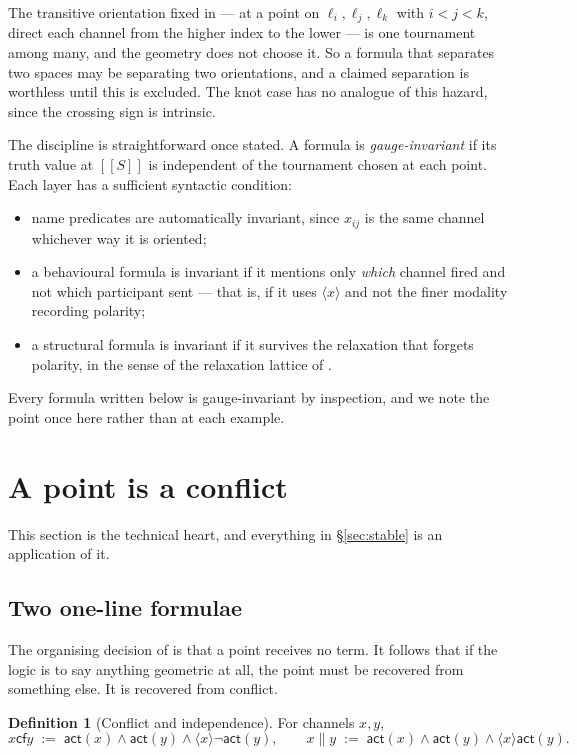 \documentclass[11pt]{article}
\theoremstyle{plain}
\theoremstyle{definition}
\newtheorem{definition}[theorem]{Definition}
\newcommand{\enc}[1]{[\![#1]\!]}
\newcommand{\act}{\mathsf{act}}
\newcommand{\cf}{\mathsf{cf}}
\begin{document}
The transitive orientation fixed in \cite[\S5]{Geometry} --- at a point on $\ell_i,\ell_j,\ell_k$
with $i<j<k$, direct each channel from the higher index to the lower --- is one tournament among
many, and the geometry does not choose it. So a formula that separates two spaces may be separating
two orientations, and a claimed separation is worthless until this is excluded. The knot case has
no analogue of this hazard, since the crossing sign is intrinsic.

The discipline is straightforward once stated. A formula is \emph{gauge-invariant} if its truth
value at $\enc{S}$ is independent of the tournament chosen at each point. Each layer has a
sufficient syntactic condition:
\begin{itemize}
\item name predicates are automatically invariant, since $x_{ij}$ is the same channel whichever way
      it is oriented;
\item a behavioural formula is invariant if it mentions only \emph{which} channel fired and not
      which participant sent --- that is, if it uses $\langle x \rangle$ and not the finer modality
      recording polarity;
\item a structural formula is invariant if it survives the relaxation that forgets polarity, in
      the sense of the relaxation lattice of \cite[\S3.3]{Classifier}.
\end{itemize}
Every formula written below is gauge-invariant by inspection, and we note the point once here
rather than at each example.

\section{A point is a conflict}
\label{sec:point}

This section is the technical heart, and everything in \S\ref{sec:stable} is an application of it.

\subsection{Two one-line formulae}

The organising decision of \cite{Geometry} is that a point receives no term. It follows that if the
logic is to say anything geometric at all, the point must be recovered from something else. It is
recovered from conflict.

\begin{definition}[Conflict and independence]
For channels $x,y$,
\[
x \cf y \;:=\; \act(x) \wedge \act(y) \wedge \langle x \rangle \neg \act(y),
\qquad
x \parallel y \;:=\; \act(x) \wedge \act(y) \wedge \langle x \rangle \act(y).
\]
\end{definition}
\end{document}
